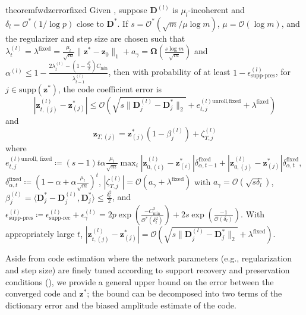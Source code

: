 \documentclass[10pt]{article} %
\newcommand{\D}{{\bm D}}
\newcommand{\z}{{\bm z}}
\begin{document}
\begin{restatable}{theorem}{fwdzerrorfixed}\label{thm:fwdzerrorfixed}
Given , suppose $\D^{(l)}$ is $\mu_l$-incoherent and $\delta_l = \mathcal{O}^{\ast}(1 / \log{p})$ close to $\D^{\ast}$. If $s = \mathcal{O}^{\ast}(\sqrt{m} / \mu \log{m})$, $\mu = \mathcal{O}(\log{m})$, and the regularizer and step size are chosen such that $\lambda_t^{(l)} = \lambda^{\text{fixed}} = \frac{\mu_l}{\sqrt{m}} \| \z^{\ast} - \z_0 \|_1 + a_{\gamma} = {\bm \Omega}(\frac{s \log{m}}{\sqrt{m}})$ and 
$\alpha^{(l)} \leq 1 - \frac{2\lambda_t^{(l)} - (1 - \frac{\delta_l^2}{2}) C_{\min}}{\lambda_{t-1}^{(l)}}$, then with probability of at least $1 - \epsilon^{(l)}_{\text{supp-pres}}$, for $j\in \text{supp}(\z^{\ast})$, the code coefficient error is
\begin{equation}
|\z_{t,(j)}^{(l)} - \z_{(j)}^{\ast} | \leq  \mathcal{O}(\sqrt{s \| \D_j^{(l)} - \D_j^{\ast} \|_2} + e_{t,j}^{(l)\text{unroll,fixed}} + \lambda^{\text{fixed}})
\end{equation}
and
\begin{equation}
\z_{T, (j)} = \z^{\ast}_{(j)} (1 - \beta_j^{(l)}) + \zeta_{T,j}^{(l)}
\end{equation}
where $e_{t,j}^{(l)\text{unroll, fixed}} \coloneqq (s-1)t \alpha \frac{\mu_l}{\sqrt{m}} \max_i | \z_{0,(i)}^{(l)} - \z_{(i)}^{\ast} | \delta_{\alpha,t-1}^{\text{fixed}} + | \z_{0,(j)}^{(l)} - \z_{(j)}^{\ast} | \delta_{\alpha,t}^{\text{fixed}}$, $\delta_{\alpha, t}^{\text{fixed}} \coloneqq (1 - \alpha + \alpha \frac{\mu_l}{\sqrt{m}})^t$, $| \zeta_{T,j}^{(l)} | = \mathcal{O}(a_{\gamma} + \lambda^{\text{fixed}})$ with $a_{\gamma} = \mathcal{O}(\sqrt{s\delta_l})$, $\beta_j^{(l)} = \langle\D_j^{\ast} - \D_j^{(l)}, \D_j^{\ast}\rangle \leq \frac{\delta_l^2}{2}$, and $\epsilon^{(l)}_{\text{supp-pres}} \coloneqq \epsilon^{(l)}_{\text{supp-rec}} + \epsilon^{(l)}_{\gamma} = 2 p \exp{(\frac{-C_{\min}^2}{\mathcal{O}^{\ast}(\delta_l^2)})}+ 2 s \exp{(\frac{-1}{\mathcal{O}(\delta_l)})}$. With appropriately large $t$, $|\z_{t,(j)}^{(l)} - \z_{(j)}^{\ast} | = \mathcal{O}(\sqrt{s \| \D_j^{(l)} - \D_j^{\ast} \|_2} + \lambda^{\text{fixed}})$.
\end{restatable}
%

Aside from code estimation where the network parameters (e.g., regularization and step size) are finely tuned according to support recovery and preservation conditions (), we provide a general upper bound on the error between the converged code and $\z^{\ast}$; the bound can be decomposed into two terms of the dictionary error and the biased amplitude estimate of the code.
\end{document}
